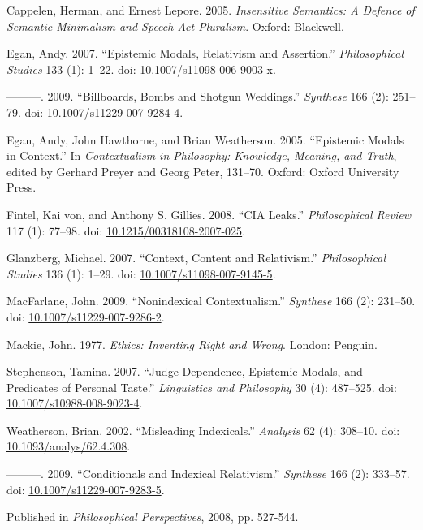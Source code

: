 \documentclass[
  11pt,
  letterpaper,
  DIV=11,
  numbers=noendperiod,
  twoside]{scrartcl}
\newlength{\cslhangindent}
\newenvironment{CSLReferences}[2] %
 {\begin{list}{}{%
  \setlength{\itemindent}{0pt}
  \setlength{\leftmargin}{0pt}
  \setlength{\parsep}{0pt}
  \ifodd #1
   \setlength{\leftmargin}{\cslhangindent}
   \setlength{\itemindent}{-1\cslhangindent}
  \fi
  \setlength{\itemsep}{#2\baselineskip}}}
 {\end{list}}
\begin{document}
\protect{}\label{refs}
\begin{CSLReferences}{1}{0}
Cappelen, Herman, and Ernest Lepore. 2005. \emph{Insensitive Semantics:
A Defence of Semantic Minimalism and Speech Act Pluralism}. Oxford:
Blackwell.

Egan, Andy. 2007. {``{Epistemic Modals, Relativism and Assertion}.''}
\emph{Philosophical Studies} 133 (1): 1--22. doi:
\href{https://doi.org/10.1007/s11098-006-9003-x}{10.1007/s11098-006-9003-x}.

---------. 2009. {``{Billboards, Bombs and Shotgun Weddings}.''}
\emph{Synthese} 166 (2): 251--79. doi:
\href{https://doi.org/10.1007/s11229-007-9284-4}{10.1007/s11229-007-9284-4}.

Egan, Andy, John Hawthorne, and Brian Weatherson. 2005. {``{Epistemic
Modals in Context}.''} In \emph{Contextualism in Philosophy: Knowledge,
Meaning, and Truth}, edited by Gerhard Preyer and Georg Peter, 131--70.
Oxford: Oxford University Press.

Fintel, Kai von, and Anthony S. Gillies. 2008. {``CIA Leaks.''}
\emph{Philosophical Review} 117 (1): 77--98. doi:
\href{https://doi.org/10.1215/00318108-2007-025}{10.1215/00318108-2007-025}.

Glanzberg, Michael. 2007. {``Context, Content and Relativism.''}
\emph{Philosophical Studies} 136 (1): 1--29. doi:
\href{https://doi.org/10.1007/s11098-007-9145-5}{10.1007/s11098-007-9145-5}.

MacFarlane, John. 2009. {``{Nonindexical Contextualism}.''}
\emph{Synthese} 166 (2): 231--50. doi:
\href{https://doi.org/10.1007/s11229-007-9286-2}{10.1007/s11229-007-9286-2}.

Mackie, John. 1977. \emph{Ethics: Inventing Right and Wrong}. London:
Penguin.

Stephenson, Tamina. 2007. {``Judge Dependence, Epistemic Modals, and
Predicates of Personal Taste.''} \emph{Linguistics and Philosophy} 30
(4): 487--525. doi:
\href{https://doi.org/10.1007/s10988-008-9023-4}{10.1007/s10988-008-9023-4}.

Weatherson, Brian. 2002. {``Misleading Indexicals.''} \emph{Analysis} 62
(4): 308--10. doi:
\href{https://doi.org/10.1093/analys/62.4.308}{10.1093/analys/62.4.308}.

---------. 2009. {``{Conditionals and Indexical Relativism}.''}
\emph{Synthese} 166 (2): 333--57. doi:
\href{https://doi.org/10.1007/s11229-007-9283-5}{10.1007/s11229-007-9283-5}.

\end{CSLReferences}



\noindent Published in\emph{
Philosophical Perspectives}, 2008, pp. 527-544.
\end{document}

